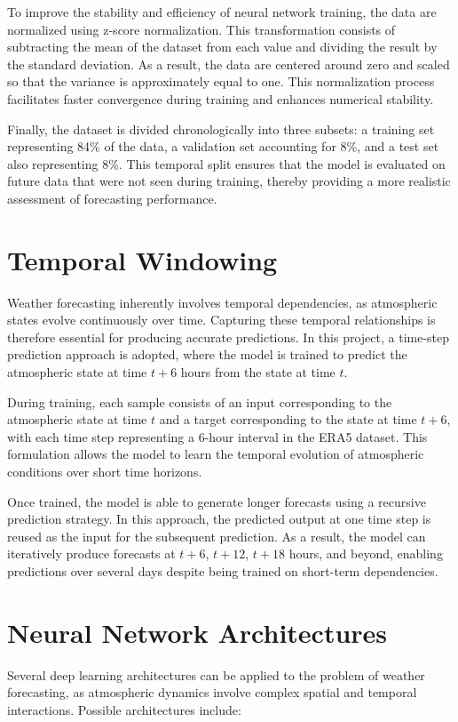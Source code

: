 To improve the stability and efficiency of neural network training, the data are normalized using z-score normalization. This transformation consists of subtracting the mean of the dataset from each value and dividing the result by the standard deviation. As a result, the data are centered around zero and scaled so that the variance is approximately equal to one. This normalization process facilitates faster convergence during training and enhances numerical stability.

Finally, the dataset is divided chronologically into three subsets: a training set representing 84\% of the data, a validation set accounting for 8\%, and a test set also representing 8\%. This temporal split ensures that the model is evaluated on future data that were not seen during training, thereby providing a more realistic assessment of forecasting performance.

\section{Temporal Windowing}
Weather forecasting inherently involves temporal dependencies, as atmospheric states evolve continuously over time. Capturing these temporal relationships is therefore essential for producing accurate predictions. In this project, a time-step prediction approach is adopted, where the model is trained to predict the atmospheric state at time $t+6$ hours from the state at time $t$.

During training, each sample consists of an input corresponding to the atmospheric state at time $t$ and a target corresponding to the state at time $t+6$, with each time step representing a 6-hour interval in the ERA5 dataset. This formulation allows the model to learn the temporal evolution of atmospheric conditions over short time horizons.

Once trained, the model is able to generate longer forecasts using a recursive prediction strategy. In this approach, the predicted output at one time step is reused as the input for the subsequent prediction. As a result, the model can iteratively produce forecasts at $t+6$, $t+12$, $t+18$ hours, and beyond, enabling predictions over several days despite being trained on short-term dependencies.

\section{Neural Network Architectures}
Several deep learning architectures can be applied to the problem of weather forecasting, as atmospheric dynamics involve complex spatial and temporal interactions.
Possible architectures include:
